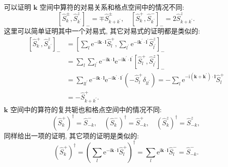 可以证明 $\boldsymbol k$ 空间中算符的对易关系和格点空间中的情况不同:
\begin{equation}
\left[\hat{S}_{k}^{\pm}, \hat{S}_{k^{\prime}}^{z}\right]_{-}=\mp \hat{S}_{k+k^{\prime}}^{\pm}, \quad\left[\hat{S}_{k}^{+}, \hat{S}_{k^{\prime}}^{-}\right]_{-}=2 \hat{S}_{k+k^{\prime}}^{z} .
\end{equation}
这里可以简单证明其中一个对易式, 其它对易式的证明都是类似的:
\begin{align}
{\left[\hat{S}_{k}^{+}, \hat{S}_{k^{\prime}}^{z}\right]_- } &=\left[\sum_{l} \mathrm{e}^{-\mathrm{i} \boldsymbol{k} \cdot \boldsymbol{l}} \hat{S}_{l}^{+}, \sum_{l^{\prime}} \mathrm{e}^{-\mathrm{i} {\boldsymbol k^{\prime}} \cdot \boldsymbol{l}^{\prime}} \hat{S}_{l^{\prime}}^{z}\right]_-\nonumber\\
&=\sum_{l} \sum_{l^{\prime}} \mathrm{e}^{-\mathrm{i} \boldsymbol{k} \cdot \boldsymbol{l}} \mathrm{e}^{-\mathrm{i} \boldsymbol{k}^{\prime} \cdot \boldsymbol{l}^{\prime}}\left[\hat{S}_{l}^{+}, \hat{S}_{l^{\prime}}^{z}\right]_- \nonumber\\
&=\sum_{ll^{\prime}} \mathrm{e}^{-\mathrm{i} \boldsymbol{k} \cdot \boldsymbol{l}} \mathrm{e}^{-\mathrm{i}\boldsymbol{k}^{\prime} \cdot \boldsymbol{l}^{\prime}}\left(-\hat{S}_{l}^{+} \delta_{l l^{\prime}}\right)=-\sum_{l}\mathrm{e}^{-\mathrm{i}\left(\boldsymbol{k}+\boldsymbol{k}^{\prime}\right) \cdot \boldsymbol{l}} \hat{S}_{l}^{+} \nonumber\\
&=-\hat{S}_{k+k^{\prime}}^{+} .
\end{align}
$\boldsymbol k$ 空间中的算符的复共轭也和格点空间中的情况不同:
\begin{equation}
\left(\hat{S}_{k}^{+}\right)^{\dagger}=\hat{S}_{-k}^{-}, \quad\left(\hat{S}_{k}^{-}\right)^{\dagger}=\hat{S}_{-k}^{+}, \quad\left(\hat{S}_{k}^{z}\right)^{\dagger}=\hat{S}_{-k}^{z} ,
\end{equation}
同样给出一项的证明, 其它项的证明是类似的:
\begin{equation}
\left(\hat{S}_{k}^{+}\right)^{\dagger}=\left(\sum_{l} \mathrm{e}^{-\mathrm{i} \boldsymbol{k} \cdot \boldsymbol{l}} \hat{S}_{l}^{+}\right)^{\dagger}=\sum_{l} \mathrm{e}^{\mathrm{i}\boldsymbol{k} \cdot \boldsymbol{l}} \hat{S}_{l}^{-}=\hat{S}_{-k}^{-}.
\end{equation}

